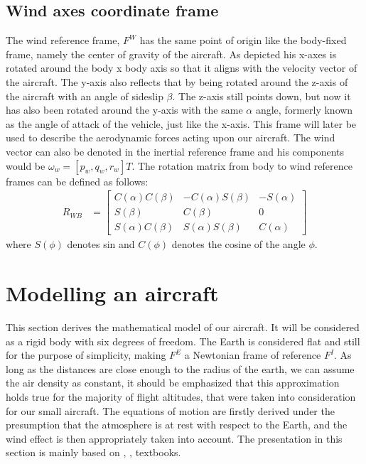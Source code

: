 \documentclass[conference]{IEEEtran}
\begin{document}
\subsection{Wind axes coordinate frame}
The wind reference frame, $F^W$ has the same point of origin like the
body-fixed frame, namely the center of gravity of the aircraft. As depicted his
x-axes is rotated around the body x body axis so that it aligns with the
velocity vector of the aircraft. The y-axis also reflects that by being rotated
around the z-axis of the aircraft with an angle of sideslip $\beta$. The z-axis
still points down, but now it has also been rotated around the y-axis with the
same $\alpha$ angle, formerly known as the angle of attack of the vehicle, just
like the x-axis. This frame will later be used to describe the aerodynamic
forces acting upon our aircraft. The wind vector can also be denoted in the
inertial reference frame and his components would be $\omega_{w}={[p_w, q_w,
            r_w]}T$. The rotation matrix from body to wind reference frames can be defined
as follows:
\begin{align}
    R_{WB} & =\begin{bmatrix}
                  C(\alpha)C(\beta) & -C(\alpha)S(\beta) & -S(\alpha) \\
                  S(\beta)          & C(\beta)           & 0          \\
                  S(\alpha)C(\beta) & S(\alpha)S(\beta)  & C(\alpha)
              \end{bmatrix}
    \label{WindToBodyRotationMatrix}
\end{align}
where $S(\phi)$ denotes sin and $C(\phi)$ denotes the cosine of the angle $\phi$.


\section{Modelling an aircraft}
This section derives the mathematical model of our aircraft. It will be
considered as a rigid body with six degrees of freedom. The Earth is considered
flat and still for the purpose of simplicity, making $F^E$ a Newtonian frame of
reference $F^I$. As long as the distances are close enough to the radius of the
earth, we can assume the air density as constant, it should be emphasized that
this approximation holds true for the majority of flight altitudes, that were
taken into consideration for our small aircraft. The equations of motion are
firstly derived under the presumption that the atmosphere is at rest with
respect to the Earth, and the wind effect is then appropriately taken into
account. The presentation in this section is mainly based on
    {\cite{Aircraft_Control_and_Simulation}},
{\cite{Dynamics_of_Atmospheric_Flight}},
{\cite{Field_Path_Following_for_Miniature_Air_vehicles}} textbooks.
\end{document}
